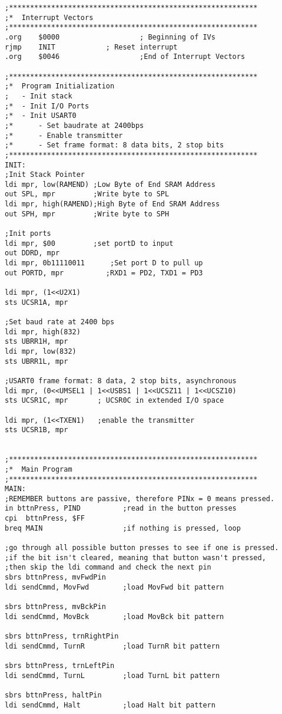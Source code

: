 \documentclass[12pt,letterpaper]{article}
\begin{document}
\begin{verbatim}
;***********************************************************
;*	Interrupt Vectors
;***********************************************************
.org	$0000					; Beginning of IVs
rjmp 	INIT			; Reset interrupt
.org	$0046					;End of Interrupt Vectors

;***********************************************************
;*	Program Initialization
;	- Init stack
;*	- Init I/O Ports
;*	- Init USART0
;*		- Set baudrate at 2400bps
;*		- Enable transmitter
;*		- Set frame format: 8 data bits, 2 stop bits
;***********************************************************
INIT:
;Init Stack Pointer
ldi mpr, low(RAMEND) ;Low Byte of End SRAM Address
out SPL, mpr         ;Write byte to SPL
ldi mpr, high(RAMEND);High Byte of End SRAM Address
out SPH, mpr         ;Write byte to SPH	

;Init ports	
ldi mpr, $00	 	 ;set portD to input
out DDRD, mpr  
ldi mpr, 0b11110011	 	 ;Set port D to pull up
out PORTD, mpr			;RXD1 = PD2, TXD1 = PD3

ldi mpr, (1<<U2X1)
sts UCSR1A, mpr

;Set baud rate at 2400 bps
ldi mpr, high(832)
sts UBRR1H, mpr
ldi mpr, low(832)
sts UBRR1L, mpr

;USART0 frame format: 8 data, 2 stop bits, asynchronous
ldi mpr, (0<<UMSEL1 | 1<<USBS1 | 1<<UCSZ11 | 1<<UCSZ10)
sts UCSR1C, mpr       ; UCSR0C in extended I/O space

ldi mpr, (1<<TXEN1)	  ;enable the transmitter
sts UCSR1B, mpr


;***********************************************************
;*	Main Program
;***********************************************************
MAIN:
;REMEMBER buttons are passive, therefore PINx = 0 means pressed.
in bttnPress, PIND			;read in the button presses
cpi  bttnPress, $FF		
breq MAIN					;if nothing is pressed, loop

;go through all possible button presses to see if one is pressed.
;if the bit isn't cleared, meaning that button wasn't pressed,
;then skip the ldi command and check the next pin
sbrs bttnPress, mvFwdPin
ldi sendCmmd, MovFwd		;load MovFwd bit pattern

sbrs bttnPress, mvBckPin
ldi sendCmmd, MovBck		;load MovBck bit pattern

sbrs bttnPress, trnRightPin
ldi sendCmmd, TurnR			;load TurnR bit pattern

sbrs bttnPress, trnLeftPin
ldi sendCmmd, TurnL			;load TurnL bit pattern

sbrs bttnPress, haltPin
ldi sendCmmd, Halt			;load Halt bit pattern


\end{verbatim}
\end{document}

